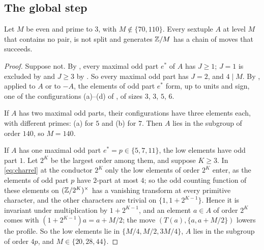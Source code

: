 \subsection{The global step}

\begin{proposition}\label{prop:globalfour}
Let $M$ be even and prime to $3$, with $M\notin\{70,110\}$. Every sextuple
$A$ at level $M$ that contains no pair, is not split and generates $\mathbb{Z}/M$ has
a chain of moves that succeeds.
\end{proposition}

\begin{proof}
Suppose not. By , every maximal odd part $e^{*}$ of $A$ has
$J\ge1$; $J=1$ is excluded by  and $J\ge3$ by
. So every maximal odd part has $J=2$, and $4\mid M$. By
, applied to $A$ or to
$-A$, the elements of odd part $e^{*}$ form, up to units and sign, one of the
configurations (a)--(d) of , of sizes $3$, $3$, $5$, $6$.

If $A$ has two maximal odd parts, their configurations have three elements
each, with different primes: (a) for $5$ and (b) for $7$. Then $A$ lies in
the subgroup of order $140$, so $M=140$.

If $A$ has one maximal odd part $e^{*}=p\in\{5,7,11\}$, the low elements have
odd part $1$. Let $2^{K}$ be the largest order among them, and suppose
$K\ge3$. In \eqref{eq:charrel} at the conductor $2^{K}$ only the low elements
of order $2^{K}$ enter, as the elements of odd part $p$ have $2$-part at most
$4$; so the odd counting function of these elements on
$(\mathbb{Z}/2^{K})^{\times}$ has a vanishing transform at every primitive
character, and the other characters are trivial on $\{1,1+2^{K-1}\}$. Hence it
is invariant under multiplication by $1+2^{K-1}$, and an element $a\in A$ of
order $2^{K}$ comes with $(1+2^{K-1})a=a+M/2$; the move
$(T(a),\{a,a+M/2\})$ lowers the profile. So the low elements lie in
$\{M/4,M/2,3M/4\}$, $A$ lies in the subgroup of order $4p$, and
$M\in\{20,28,44\}$.


\end{proof}
